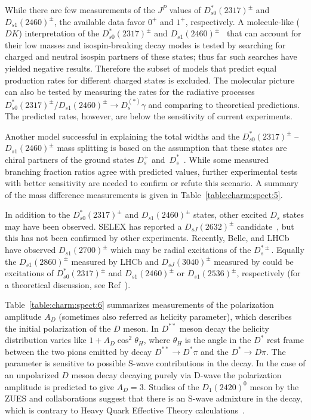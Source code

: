 While there are few measurements of the $J^P$ values of $D_{s0}^\ast(2317)^{\pm}$ and $D_{s1}(2460)^{\pm}$, the available data favor $0^+$ and $1^+$, respectively. A molecule-like ($DK$) interpretation of the $D_{s0}^\ast(2317)^{\pm}$ and $D_{s1}(2460)^{\pm}$~\cite{Barnes:2003dj,Lipkin:2003zk} that can account for their low masses and isospin-breaking decay modes is tested by searching for charged and neutral isospin partners of these states; thus far such searches have yielded negative results. Therefore the subset of models that predict equal production rates for different charged states is excluded. The molecular picture can also be tested by measuring the rates for the radiative processes $D_{s0}^\ast(2317)^{\pm}/D_{s1}(2460)^{\pm}\to D_s^{(\ast)}\gamma$ and comparing to theoretical predictions. The predicted rates, however, are below the sensitivity of current experiments. 

Another model successful in explaining the total widths and the $D_{s0}^\ast(2317)^{\pm}$ -- $D_{s1}(2460)^{\pm}$ mass splitting is based on the assumption that these states are chiral partners of the ground states $D_{s}^{+}$ and~$D_{s}^{*}$~\cite{Bardeen:2003kt}. While some measured branching fraction ratios agree with predicted
values, further experimental tests with better sensitivity are needed to confirm or refute this scenario. A summary of the mass difference measurements is given in Table~\ref{table:charm:spect:5}.

In addition to the $D_{s0}^\ast(2317)^{\pm}$ and $D_{s1}(2460)^{\pm}$ states, other excited $D_s$ states may have been observed. SELEX has reported a $D_{sJ}(2632)^{\pm}$ candidate~\cite{Evdokimov:2004iy}, but this has not been confirmed by other experiments. Recently, Belle, \babar{} and LHCb have observed $D_{s1}(2700)^{\pm}$ which may be radial excitations of the $D_s^{\ast\pm}$. Equally the $D_{s1}(2860)^{\pm}$ measured by LHCb and $D_{sJ}(3040)^{\pm}$ measured by \babar{} could be excitations of $D_{s0}^\ast(2317)^{\pm}$ and $D_{s1}(2460)^{\pm}$ or $D_{s1}(2536)^{\pm}$, respectively (for a theoretical discussion, see Ref~\cite{Matsuki:2006rz}).

Table~\ref{table:charm:spect:6} summarizes measurements of the polarization amplitude $A_{D}$ (sometimes also referred as helicity parameter), which describes the initial polarization of the $D$ meson. In $D^{\ast\ast}$ meson decay the helicity distribution varies like $1 + A_{D}\cos^{2}\theta_{H}$, where $\theta_{H}$ is the angle in the $D^{\ast}$ rest frame between the two pions emitted by decay $D^{\ast\ast} \to D^{\ast}\pi$ and the $D^{\ast} \to D \pi$. The parameter is sensitive to possible S-wave contributions in the decay. In the case of an unpolarized $D$ meson decay decaying purely via D-wave the polarization amplitude is predicted to give $A_{D}=3$. 
Studies of the $D_{1}(2420)^{0}$ meson by the ZUES and \babar{} collaborations suggest that there is an S-wave admixture in the decay, which is  contrary to Heavy Quark Effective Theory calculations~\cite{Isgur:1989vq,Neubert:1993mb}.

